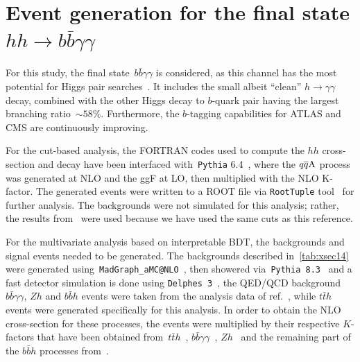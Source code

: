 \section{Event generation for the final state $ hh \to b \bar b \gamma \gamma$ \label{sec:evnt}}
For this study, the final state~$b \bar{b} \gamma \gamma$ is considered, as this channel has the most potential for Higgs pair searches~\cite{Cepeda:2019klc}. It includes the small albeit ``clean'' $h \to \gamma \gamma$ decay, combined with the other Higgs decay to $b$-quark pair having the largest branching ratio~$\sim 58\%$. Furthermore,  the $b$-tagging capabilities for ATLAS and CMS are continuously improving. 
\par 
For the cut-based analysis, the FORTRAN codes used to compute the $hh$ cross-section and decay have been interfaced with~\texttt{Pythia} 6.4~\cite{Sjostrand:2006za}, where the $q\overline q \rm A$ process was generated at NLO and the ggF at LO, then multiplied with the NLO K-factor. The generated events were written to a ROOT file via \texttt{RootTuple} tool~\cite{roottuple} for further analysis. The backgrounds were not simulated for this analysis; rather, the results from~\cite{Azatov:2015oxa} were used because we have used the same cuts as this reference.
\par 
For the multivariate analysis based on interpretable BDT, the backgrounds and signal events needed to be generated. The backgrounds described in~\autoref{tab:xsec14} were generated using~\texttt{MadGraph\_aMC@NLO}~\cite{Alwall:2014hca}, then showered via~\texttt{Pythia 8.3}~\cite{Sjostrand:2014zea} and a fast detector simulation is done using \texttt{Delphes 3}~\cite{deFavereau:2013fsa}, the QED/QCD background $ b \bar b\gamma \gamma$, $Zh$  and $ b \bar b h$ events were taken from the analysis data of ref.~\cite{Grojean:2020ech}, while $t \bar t h $ events were generated specifically for this analysis. In order to obtain the NLO cross-section for these processes, the events were multiplied by their respective $K$-factors that have been obtained from~$t\bar{t}h$~\cite{Beenakker:2001rj}, $b\bar b \gamma\gamma$~\cite{Fah:2017wlf}, $Zh$~\cite{Campanario:2014lza} and the remaining part of the $b\bar bh$ processes from~\cite{Dawson:2005vi}. 
